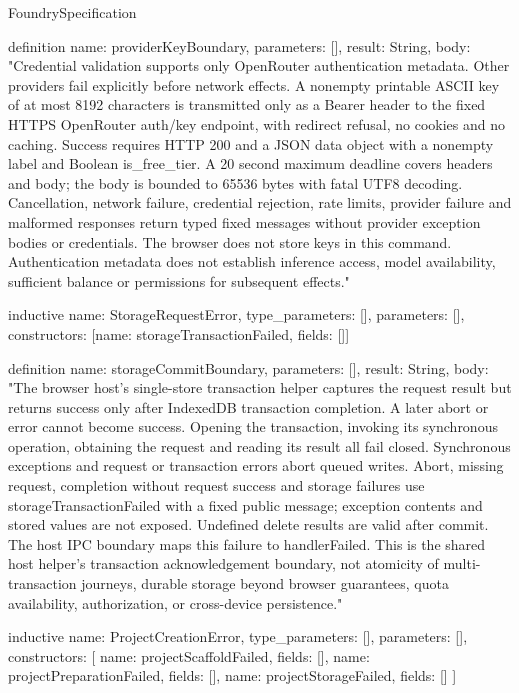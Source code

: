 \begin{lexlean}{FoundrySpecification}
\begin{semanticmodule}
definition{
  name: providerKeyBoundary,
  parameters: [],
  result: String,
  body: "Credential validation supports only OpenRouter authentication metadata. Other providers fail explicitly before network effects. A nonempty printable ASCII key of at most 8192 characters is transmitted only as a Bearer header to the fixed HTTPS OpenRouter auth/key endpoint, with redirect refusal, no cookies and no caching. Success requires HTTP 200 and a JSON data object with a nonempty label and Boolean is_free_tier. A 20 second maximum deadline covers headers and body; the body is bounded to 65536 bytes with fatal UTF8 decoding. Cancellation, network failure, credential rejection, rate limits, provider failure and malformed responses return typed fixed messages without provider exception bodies or credentials. The browser does not store keys in this command. Authentication metadata does not establish inference access, model availability, sufficient balance or permissions for subsequent effects."
}

inductive{
  name: StorageRequestError,
  type_parameters: [],
  parameters: [],
  constructors: [{name: storageTransactionFailed, fields: []}]
}

definition{
  name: storageCommitBoundary,
  parameters: [],
  result: String,
  body: "The browser host's single-store transaction helper captures the request result but returns success only after IndexedDB transaction completion. A later abort or error cannot become success. Opening the transaction, invoking its synchronous operation, obtaining the request and reading its result all fail closed. Synchronous exceptions and request or transaction errors abort queued writes. Abort, missing request, completion without request success and storage failures use storageTransactionFailed with a fixed public message; exception contents and stored values are not exposed. Undefined delete results are valid after commit. The host IPC boundary maps this failure to handlerFailed. This is the shared host helper's transaction acknowledgement boundary, not atomicity of multi-transaction journeys, durable storage beyond browser guarantees, quota availability, authorization, or cross-device persistence."
}

inductive{
  name: ProjectCreationError,
  type_parameters: [],
  parameters: [],
  constructors: [
    {name: projectScaffoldFailed, fields: []},
    {name: projectPreparationFailed, fields: []},
    {name: projectStorageFailed, fields: []}
  ]
}


\end{semanticmodule}
\end{lexlean}
